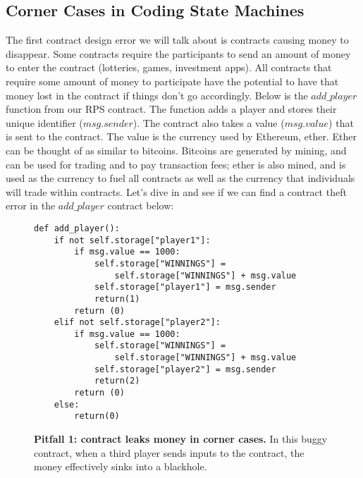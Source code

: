 \documentclass[10pt,twocolumn,letterpaper]{article}
\begin{document}
\subsection{Corner Cases in Coding State Machines}
The first contract design error we will talk about is contracts causing money to disappear. Some contracts require the participants to send an amount of money to enter the contract (lotteries, games, investment apps). All contracts that require some amount of money to participate have the potential to have that money lost in the contract if things don't go accordingly. Below is the $add\_player$ function from our RPS contract. The function adds a player and stores their unique identifier ($msg.sender$). The contract also takes a value ($msg.value$) that is sent to the contract. The value is the currency used by Ethereum, ether. Ether can be thought of as similar to bitcoins. Bitcoins are generated by mining, and can be used for trading and to pay transaction fees; ether is also mined, and is used as the currency to fuel all contracts as well as the currency that individuals will trade within contracts. Let's dive in and see if we can find a contract theft error in the $add\_player$ contract below: 

\begin{figure}
\begin{mdframed}
\begin{verbatim}
def add_player():
	if not self.storage["player1"]:
		if msg.value == 1000:
			self.storage["WINNINGS"] = 
				self.storage["WINNINGS"] + msg.value
			self.storage["player1"] = msg.sender
			return(1)
		return (0)
	elif not self.storage["player2"]:
		if msg.value == 1000:
			self.storage["WINNINGS"] = 
				self.storage["WINNINGS"] + msg.value
			self.storage["player2"] = msg.sender
			return(2)
		return (0)
	else:
		return(0)
\end{verbatim}
\end{mdframed}
\caption{{\bf Pitfall 1: contract leaks money in corner cases.}
In this buggy contract, when a third player 
sends inputs to the contract, the
money effectively sinks into a blackhole.
}
\end{figure}
\end{document}
